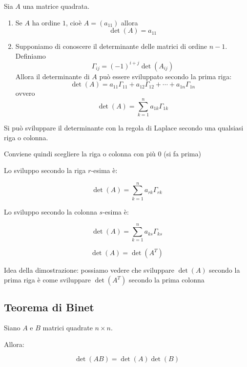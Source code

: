 \documentclass[
  a4paper,
]{article}
\begin{document}
\begin{teoremabox}
Sia \(A\) una matrice quadrata.

\begin{enumerate}
\def\labelenumi{\arabic{enumi}.}
\item
  Se \(A\) ha ordine \(1\), cioè \(A=(a_{11})\) allora \[
  \det(A)=a_{11}
  \]
\item
  Supponiamo di conoscere il determinante delle matrici di ordine
  \(n-1\). Definiamo \[
  \Gamma_{ij}=(-1)^{i+j}\det(A_{ij})
  \] Allora il determinante di \(A\) può essere sviluppato secondo la
  prima riga: \[
  \det(A)=
  a_{11}\Gamma_{11}
  +a_{12}\Gamma_{12}
  +\cdots+
  a_{1n}\Gamma_{1n} 
  \] ovvero \[
  \det(A)=\sum_{k=1}^{n} a_{1k}\Gamma_{1k}
  \]
\end{enumerate}
\end{teoremabox}

\begin{propositionbox}
Si può sviluppare il determinante con la regola di Laplace secondo una
qualsiasi riga o colonna.
\end{propositionbox}

\begin{notebox}
Conviene quindi scegliere la riga o colonna con più 0 (si fa prima)
\end{notebox}

\bigskip

Lo sviluppo secondo la riga \(r\)-esima è:

\[
\det(A)=\sum_{k=1}^{n} a_{rk}\Gamma_{rk}
\]

Lo sviluppo secondo la colonna \(s\)-esima è:

\[
\det(A)=\sum_{k=1}^{n} a_{ks}\Gamma_{ks}
\]

\begin{propositionbox}
\[
\det(A) = \det(A^T)
\]
\end{propositionbox}

\begin{proofbox}
Idea della dimostrazione: possiamo vedere che sviluppare \(\det(A)\)
secondo la prima riga è come sviluppare \(\det(A^T)\) secondo la prima
colonna
\end{proofbox}

\hypertarget{teorema-di-binet}{%
\subsection{Teorema di Binet}\label{teorema-di-binet}}

\begin{teoremabox}
Siano \(A\) e \(B\) matrici quadrate \(n\times n\).

Allora:

\[
\det(AB)=\det(A)\det(B)
\]
\end{teoremabox}
\end{document}
